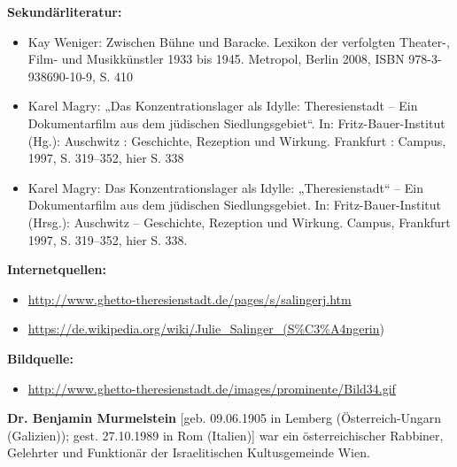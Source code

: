 \documentclass[a4paper]{article}
\begin{document}
\bigskip

\textbf{Sekundärliteratur:}

\begin{itemize}
\item Kay Weniger: Zwischen Bühne und Baracke. Lexikon der verfolgten Theater-, Film- und Musikkünstler 1933 bis 1945.
Metropol, Berlin 2008, ISBN 978-3-938690-10-9, S. 410 
\item  Karel Magry: „Das Konzentrationslager als Idylle: {\textquotedbl}Theresienstadt{\textquotedbl} – Ein
Dokumentarfilm aus dem jüdischen Siedlungsgebiet“. In: Fritz-Bauer-Institut (Hg.): Auschwitz : Geschichte, Rezeption
und Wirkung. Frankfurt : Campus, 1997, S. 319–352, hier S. 338
\item Karel Magry: Das Konzentrationslager als Idylle: „Theresienstadt“ – Ein Dokumentarfilm aus dem jüdischen
Siedlungsgebiet. In: Fritz-Bauer-Institut (Hrsg.): Auschwitz – Geschichte, Rezeption und Wirkung. Campus, Frankfurt
1997, S. 319–352, hier S. 338.
\end{itemize}

\bigskip

\textbf{Internetquellen:}

\begin{itemize}
\item \url{http://www.ghetto-theresienstadt.de/pages/s/salingerj.htm} 
\item \url{https://de.wikipedia.org/wiki/Julie_Salinger_(S%C3%A4ngerin}) 
\end{itemize}

\bigskip

\textbf{Bildquelle:}

\begin{itemize}
\item \url{http://www.ghetto-theresienstadt.de/images/prominente/Bild34.gif} 
\end{itemize}
\textbf{Dr. Benjamin Murmelstein }[geb. 09.06.1905 in Lemberg (Österreich-Ungarn (Galizien)); gest. 27.10.1989 in Rom
(Italien)] war ein österreichischer Rabbiner, Gelehrter und Funktionär der Israelitischen Kultusgemeinde Wien.
\end{document}
